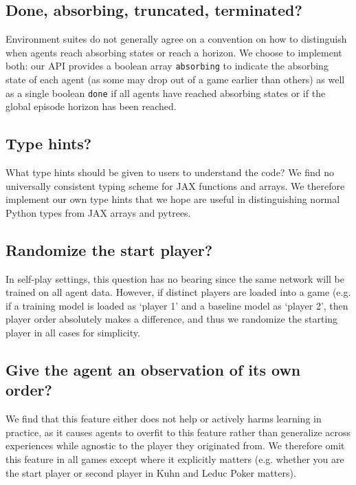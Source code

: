 \subsection{Done, absorbing, truncated, terminated?}
Environment suites do not generally agree on a convention on how to distinguish when agents reach absorbing states or reach a horizon. We choose to implement both: our API provides a boolean array \texttt{absorbing} to indicate the absorbing state of each agent (as some may drop out of a game earlier than others) as well as a single boolean \texttt{done} if all agents have reached absorbing states or if the global episode horizon has been reached.

\subsection{Type hints?}
What type hints should be given to users to understand the code? We find no universally consistent typing scheme for JAX functions and arrays. We therefore implement our own type hints that we hope are useful in distinguishing normal Python types from JAX arrays and pytrees.

\subsection{Randomize the start player?}
In self-play settings, this question has no bearing since the same network will be trained on all agent data. However, if distinct players are loaded into a game (e.g. if a training model is loaded as `player 1' and a baseline model as `player 2', then player order absolutely makes a difference, and thus we randomize the starting player in all cases for simplicity.

\subsection{Give the agent an observation of its own order?}
We find that this feature either does not help or actively harms learning in practice, as it causes agents to overfit to this feature rather than generalize across experiences while agnostic to the player they originated from. We therefore omit this feature in all games except where it explicitly matters (e.g. whether you are the start player or second player in Kuhn and Leduc Poker matters).
